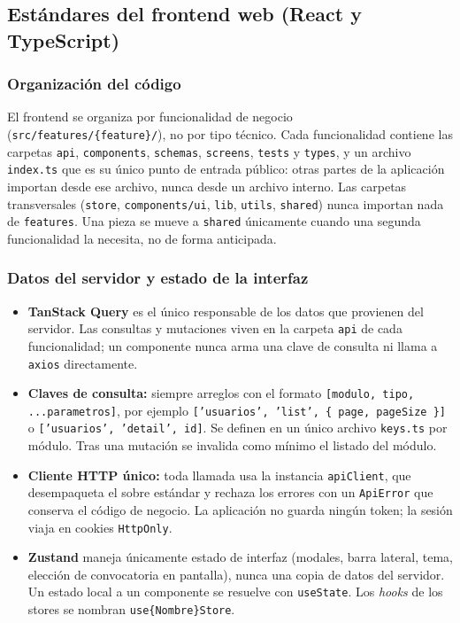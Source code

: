 \subsection{Estándares del frontend web (React y TypeScript)}

\subsubsection{Organización del código}

El frontend se organiza por funcionalidad de negocio (\texttt{src/features/\{feature\}/}), no por tipo técnico. Cada funcionalidad contiene las carpetas \texttt{api}, \texttt{components}, \texttt{schemas}, \texttt{screens}, \texttt{tests} y \texttt{types}, y un archivo \texttt{index.ts} que es su único punto de entrada público: otras partes de la aplicación importan desde ese archivo, nunca desde un archivo interno. Las carpetas transversales (\texttt{store}, \texttt{components/ui}, \texttt{lib}, \texttt{utils}, \texttt{shared}) nunca importan nada de \texttt{features}. Una pieza se mueve a \texttt{shared} únicamente cuando una segunda funcionalidad la necesita, no de forma anticipada.

\subsubsection{Datos del servidor y estado de la interfaz}

\begin{itemize}
    \item \textbf{TanStack Query} es el único responsable de los datos que provienen del servidor. Las consultas y mutaciones viven en la carpeta \texttt{api} de cada funcionalidad; un componente nunca arma una clave de consulta ni llama a \texttt{axios} directamente.
    \item \textbf{Claves de consulta:} siempre arreglos con el formato \texttt{[modulo, tipo, ...parametros]}, por ejemplo \texttt{['usuarios', 'list', \{ page, pageSize \}]} o \texttt{['usuarios', 'detail', id]}. Se definen en un único archivo \texttt{keys.ts} por módulo. Tras una mutación se invalida como mínimo el listado del módulo.
    \item \textbf{Cliente HTTP único:} toda llamada usa la instancia \texttt{apiClient}, que desempaqueta el sobre estándar y rechaza los errores con un \texttt{ApiError} que conserva el código de negocio. La aplicación no guarda ningún token; la sesión viaja en cookies \texttt{HttpOnly}.
    \item \textbf{Zustand} maneja únicamente estado de interfaz (modales, barra lateral, tema, elección de convocatoria en pantalla), nunca una copia de datos del servidor. Un estado local a un componente se resuelve con \texttt{useState}. Los \textit{hooks} de los stores se nombran \texttt{use\{Nombre\}Store}.
\end{itemize}

